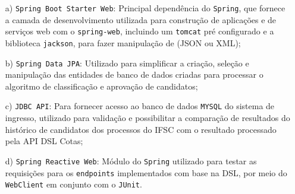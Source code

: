 \begin{enumerate}
 
\item[a)] \texttt{Spring Boot Starter Web}: Principal dependência do \texttt{Spring}, que fornece a camada de desenvolvimento utilizada para construção de aplicações e de serviços web com o \texttt{spring-web}, incluindo um \texttt{tomcat} pré configurado e a biblioteca \texttt{jackson}, para fazer manipulação de (JSON ou XML);


\item[b)] \texttt{Spring Data JPA}:  Utilizado para simplificar a criação, seleção e manipulação das entidades de banco de dados criadas para processar o algoritmo de classificação e aprovação de candidatos; 

\item[c)] \texttt{JDBC API}: Para fornecer acesso ao banco de dados \texttt{MYSQL} do sistema de ingresso, utilizado para validação e possibilitar a comparação de resultados do histórico de candidatos dos processos do \gls{IFSC} com o resultado processado pela \gls{API} DSL Cotas; 


\item[d)] \texttt{Spring Reactive Web}: Módulo do \texttt{Spring} utilizado para testar as requisições para os \texttt{endpoints} implementados com base na DSL, por meio do \texttt{WebClient} em conjunto com o \texttt{JUnit}.

\end{enumerate}

